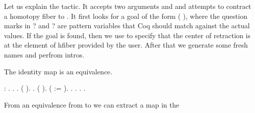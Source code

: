 \documentclass[12pt]{report}
\begin{document}
Let us explain the tactic. It accepts two arguments  and 
   and attempts to contract a homotopy fiber to  \coqdocvar{\_}  . It
   first looks for a goal of the form  (  ), where
   the question marks in ? and ? are pattern variables that Coq
   should match against the actual values. If the goal is found, then
   we use  to specify that the center of retraction is at the
   element  \coqdocvar{\_}   of hfiber provided by the user. After that
   we generate some fresh names and perfrom intros. \begin{coqdoccode}
\coqdocemptyline
\end{coqdoccode}
The identity map is an equivalence. \begin{coqdoccode}
\coqdocemptyline
\coqdocnoindent
{}   :   .\coqdoceol
\coqdocnoindent
{}.\coqdoceol
\coqdocindent{1.00em}
 .\coqdoceol
\coqdocindent{1.00em}
\coqdocvar{\ensuremath{\exists}} ( ).\coqdoceol
\coqdocindent{1.00em}
 .\coqdoceol
\coqdocindent{1.00em}
  ( ).\coqdoceol
\coqdocindent{1.00em}
   ( := ).\coqdoceol
\coqdocindent{1.00em}
.\coqdoceol
\coqdocindent{1.00em}
  .\coqdoceol
\coqdocindent{1.00em}
.\coqdoceol
\coqdocnoindent
{}.\coqdoceol
\coqdocemptyline
\end{coqdoccode}
From an equivalence from  to  we can extract a map in the
\end{document}
